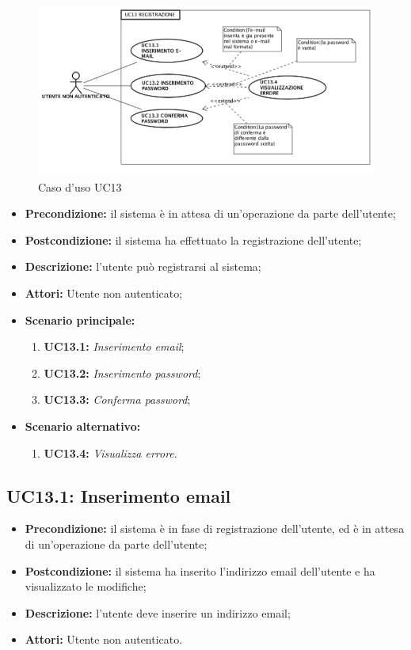 \begin{figure}[h]
	\begin{center}
	\includegraphics[scale=0.4]{diagram/UC13.png}
	\caption{Caso d'uso UC13}
	\end{center}
\end{figure}
\begin{itemize}
	\item \textbf{Precondizione:} il sistema è in attesa di un'operazione da parte dell'utente;
	\item \textbf{Postcondizione:} il sistema ha effettuato la registrazione dell'utente;
	\item \textbf{Descrizione:} l'utente può registrarsi al sistema;
	\item \textbf{Attori:} Utente non autenticato;
	\item \textbf{Scenario principale:}
	\begin{enumerate}
		\item \textbf{ UC13.1:} \textit{ Inserimento email};
		\item \textbf{ UC13.2:} \textit{ Inserimento password};
		\item \textbf{ UC13.3:} \textit{ Conferma password};
	\end{enumerate}
	\item \textbf{Scenario alternativo:}
	\begin{enumerate}
		\item \textbf{ UC13.4:} \textit{ Visualizza errore}.
	\end{enumerate}
\end{itemize}
\subsection{ UC13.1: Inserimento email}

\begin{itemize}
	\item \textbf{Precondizione:} il sistema è in fase di registrazione dell'utente, ed è in attesa di un'operazione da parte dell'utente;
	\item \textbf{Postcondizione:} il sistema ha inserito l'indirizzo email dell'utente e ha visualizzato le modifiche;
	\item \textbf{Descrizione:} l'utente deve inserire un indirizzo email;
	\item \textbf{Attori:} Utente non autenticato.
\end{itemize}
